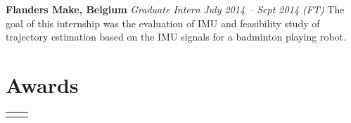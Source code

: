 \documentclass[10pt, oneside]{article} %
\begin{document}
\begin{paracol}{2}
\workposition
{\textbf{Flanders Make, Belgium}}
{\textit{Graduate Intern} \hfill \footnotesize{\textit{July 2014 -- Sept 2014 \hspace{10pt}(FT)}}}
{The goal of this internship was the evaluation of IMU and feasibility study of trajectory estimation based on the IMU signals for a badminton playing robot.}




\vspace{-.4cm}


\section{Awards}
\begin{supertabular}{rl}

	

\end{supertabular}


\switchcolumn %



\end{paracol}
\end{document}
